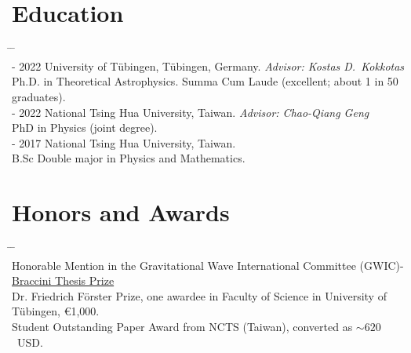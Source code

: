 \documentclass[10pt,floatfix,a4paper]{article}
\begin{document}
\section*{Education}
\begin{tabbing}
  \hspace*{5mm} \= \hspace*{2.3cm} \= \hspace*{10cm} \\[-3ex]
   - 2022 \>  University of T{\"u}bingen, T\"ubingen, Germany. \textit{Advisor: Kostas D.~Kokkotas} \\
  \> \> Ph.D. in Theoretical Astrophysics.  Summa Cum Laude (excellent; about 1 in 50 graduates). \\[1ex]
   - 2022 \> National Tsing Hua University, Taiwan. \textit{Advisor: Chao-Qiang Geng} \\
  \> \> PhD in Physics (joint degree). \\[1ex]
   - 2017 \> National Tsing Hua University, Taiwan. \\
  \> \> B.Sc Double major in Physics and Mathematics.
\end{tabbing}


\section*{Honors and Awards}
\begin{tabbing}
  \hspace*{5mm} \= \hspace*{2.3cm} \= \hspace*{10cm} \\[-3ex]
  \> Honorable Mention in the Gravitational Wave International Committee (GWIC)-\href{https://gwic.ligo.org/thesis-prize.html}{Braccini Thesis Prize} \\
  \> Dr. Friedrich F{\"o}rster Prize, one awardee in Faculty of Science in University of T{\"u}bingen, \euro{1,000}. \\
  \> Student Outstanding Paper Award from NCTS (Taiwan), converted as $\sim620$~USD.
\end{tabbing}
\end{document}
